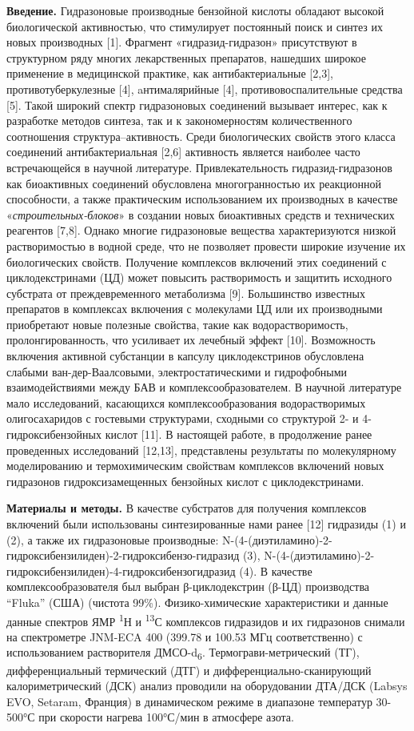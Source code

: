 {\bfseries Введение.} Гидразоновые производные бензойной кислоты обладают
высокой биологической активностью, что стимулирует постоянный поиск и
синтез их новых производных {[}1{]}. Фрагмент «гидразид-гидразон»
присутствуют в структурном ряду многих лекарственных препаратов,
нашедших широкое применение в медицинской практике, как
антибактериальные {[}2,3{]}, противотуберкулезные {[}4{]},
aнтималярийные {[}4{]}, противовоспалительные средства {[}5{]}. Такой
широкий спектр гидразоновых соединений вызывает интерес, как к
разработке методов синтеза, так и к закономерностям количественного
соотношения структура--активность. Среди биологических свойств этого
класса соединений антибактериальная {[}2,6{]} активность является
наиболее часто встречающейся в научной литературе. Привлекательность
гидразид-гидразонов как биоактивных соединений обусловлена
многогранностью их реакционной способности, а также практическим
использованием их производных в качестве «\emph{строительных-блоков}» в
создании новых биоактивных средств и технических реагентов {[}7,8{]}.
Однако многие гидразоновые вещества характеризуются низкой
растворимостью в водной среде, что не позволяет провести широкие
изучение их биологических свойств. Получение комплексов включений этих
соединений с циклодекстринами (ЦД) может повысить растворимость и
защитить исходного субстрата от преждевременного метаболизма {[}9{]}.
Большинство известных препаратов в комплексах включения с молекулами ЦД
или их производными приобретают новые полезные свойства, такие как
водорастворимость, пролонгированность, что усиливает их лечебный эффект
{[}10{]}. Возможность включения активной субстанции в капсулу
циклодекстринов обусловлена слабыми ван-дер-Ваалсовыми,
электростатическими и гидрофобными взаимодействиями между БАВ и
комплексообразователем. В научной литературе мало исследований,
касающихся комплексообразования водорастворимых олигосахаридов с
гостевыми структурами, сходными со структурой 2- и 4-гидроксибензойных
кислот {[}11{]}. В настоящей работе, в продолжение ранее проведенных
исследований {[}12,13{]}, представлены результаты по молекулярному
моделированию и термохимическим свойствам комплексов включений новых
гидразонов гидроксизамещенных бензойных кислот с циклодекстринами.

{\bfseries Материалы и методы.} В качестве субстратов для получения
комплексов включений были использованы синтезированные нами ранее
{[}12{]} гидразиды (1) и (2), а также их гидразоновые производные:
N-(4-(диэтиламино)-2-гидроксибензилиден)-2-гидроксибензо-гидразид (3),
N-(4-(диэтиламино)-2-гидроксибензилиден)-4-гидроксибензогидразид (4). В
качестве комплексообразователя был выбран β-циклодекстрин (β-ЦД)
производства ``Fluka'' (США) (чистота 99\%). Физико-химические
характеристики и данные данные спектров ЯМР \textsuperscript{1}Н и
\textsuperscript{13}С комплексов гидразидов и их гидразонов снимали на
спектрометре JNM-ECA 400 (399.78 и 100.53 МГц соответственно) с
использованием растворителя ДМСО-d\textsubscript{6}.
Термограви-метрический (ТГ), дифференциальный термический (ДТГ) и
дифференциально-сканирующий калориметрический (ДСК) анализ проводили на
оборудовании ДТА/ДСК (Labsys EVO, Setaram, Франция) в динамическом
режиме в диапазоне температур 30-500°С при скорости нагрева 100°С/мин в
атмосфере азота.

